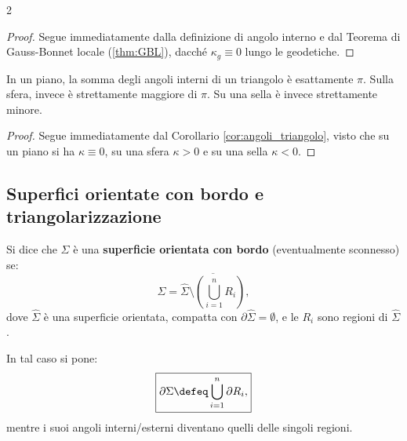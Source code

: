 \begin{multicols*}{2}
    \begin{proof}
        Segue immediatamente dalla definizione di angolo interno e dal Teorema di Gauss-Bonnet locale (\ref{thm:GBL}), dacché
        $\kappa_g \equiv 0$ lungo le geodetiche.
    \end{proof}

    \begin{corollary}
        In un piano, la somma degli angoli interni di un triangolo
        è esattamente $\pi$. Sulla sfera, invece è strettamente maggiore
        di $\pi$. Su una sella è invece strettamente minore.
    \end{corollary}

    \begin{proof}
        Segue immediatamente dal Corollario \ref{cor:angoli_triangolo}, visto
        che su un piano si ha $\kappa \equiv 0$, su una sfera $\kappa > 0$ e
        su una sella $\kappa < 0$.
    \end{proof}

    \subsection{Superfici orientate con bordo e triangolarizzazione}

    \begin{definition}
        Si dice che $\Sigma$ è una \textbf{superficie orientata con bordo} (eventualmente
        sconnesso) se:
        \[
            \Sigma = \overline{\hat{\Sigma} \setminus \left( \bigcup_{i=1}^n R_i \right)},
        \]
        dove $\hat{\Sigma}$ è una superficie orientata, compatta con $\partial \hat{\Sigma} = \emptyset$,
        e le $R_i$ sono regioni di $\hat{\Sigma}$. \smallskip

        In tal caso si pone:
        \[
            \boxed{\partial \Sigma \defeq \bigcup_{i=1}^n \partial R_i,}
        \]
        mentre i suoi angoli interni/esterni diventano quelli delle singoli regioni.
    \end{definition}


\end{multicols*}
